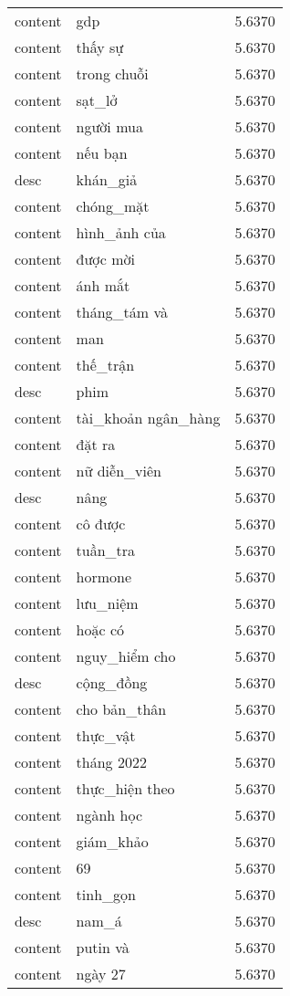 \documentclass{article}
\begin{document}
\begin{tabular}{lll}
content & gdp & 5.6370\\
content & thấy sự & 5.6370\\
content & trong chuỗi & 5.6370\\
content & sạt\_lở & 5.6370\\
content & người mua & 5.6370\\
content & nếu bạn & 5.6370\\
desc & khán\_giả & 5.6370\\
content & chóng\_mặt & 5.6370\\
content & hình\_ảnh của & 5.6370\\
content & được mời & 5.6370\\
content & ánh mắt & 5.6370\\
content & tháng\_tám và & 5.6370\\
content & man & 5.6370\\
content & thế\_trận & 5.6370\\
desc & phim & 5.6370\\
content & tài\_khoản ngân\_hàng & 5.6370\\
content & đặt ra & 5.6370\\
content & nữ diễn\_viên & 5.6370\\
desc & nâng & 5.6370\\
content & cô được & 5.6370\\
content & tuần\_tra & 5.6370\\
content & hormone & 5.6370\\
content & lưu\_niệm & 5.6370\\
content & hoặc có & 5.6370\\
content & nguy\_hiểm cho & 5.6370\\
desc & cộng\_đồng & 5.6370\\
content & cho bản\_thân & 5.6370\\
content & thực\_vật & 5.6370\\
content & tháng 2022 & 5.6370\\
content & thực\_hiện theo & 5.6370\\
content & ngành học & 5.6370\\
content & giám\_khảo & 5.6370\\
content & 69 & 5.6370\\
content & tinh\_gọn & 5.6370\\
desc & nam\_á & 5.6370\\
content & putin và & 5.6370\\
content & ngày 27 & 5.6370\\

\end{tabular}
\end{document}
